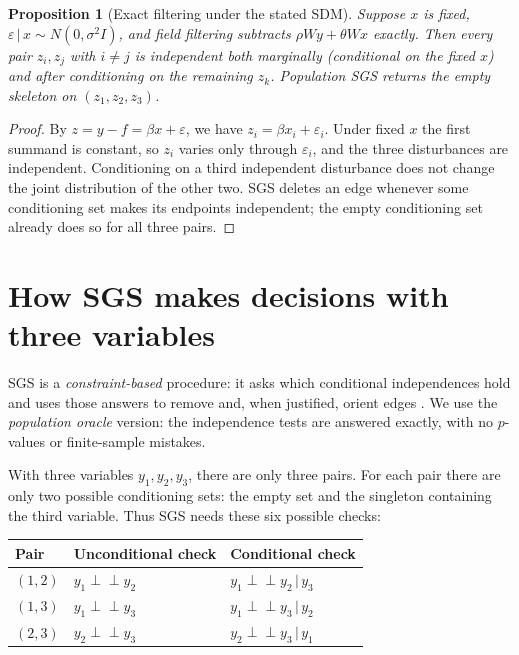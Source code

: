 \documentclass[11pt,a4paper]{article}
\newcommand{\indep}{\mathrel{\perp\!\!\!\perp}}
\newcommand{\given}{\,\vert\,}
\newtheorem{proposition}{Proposition}
\begin{document}
\begin{proposition}[Exact filtering under the stated SDM]
Suppose $x$ is fixed, $\varepsilon\given x\sim N(0,\sigma^2I)$, and field filtering subtracts $\rho Wy+\theta Wx$ exactly. Then every pair $z_i,z_j$ with $i\ne j$ is independent both marginally (conditional on the fixed $x$) and after conditioning on the remaining $z_k$. Population SGS returns the empty skeleton on $(z_1,z_2,z_3)$.
\end{proposition}
\begin{proof}
By $z=y-f=\beta x+\varepsilon$, we have $z_i=\beta x_i+\varepsilon_i$. Under fixed $x$ the first summand is constant, so $z_i$ varies only through $\varepsilon_i$, and the three disturbances are independent. Conditioning on a third independent disturbance does not change the joint distribution of the other two. SGS deletes an edge whenever some conditioning set makes its endpoints independent; the empty conditioning set already does so for all three pairs.
\end{proof}

\section{How SGS makes decisions with three variables}\label{sec:sgs}

SGS is a \emph{constraint-based} procedure: it asks which conditional independences hold and uses those answers to remove and, when justified, orient edges \cite{spirtes,colombo}. We use the \emph{population oracle} version: the independence tests are answered exactly, with no $p$-values or finite-sample mistakes.

With three variables $y_1,y_2,y_3$, there are only three pairs. For each pair there are only two possible conditioning sets: the empty set and the singleton containing the third variable. Thus SGS needs these six possible checks:
\begin{center}
\begin{tabular}{@{}lll@{}}
\toprule
Pair&Unconditional check&Conditional check\\\midrule
$(1,2)$&$y_1\indep y_2$&$y_1\indep y_2\given y_3$\\
$(1,3)$&$y_1\indep y_3$&$y_1\indep y_3\given y_2$\\
$(2,3)$&$y_2\indep y_3$&$y_2\indep y_3\given y_1$\\
\bottomrule
\end{tabular}
\end{center}
\end{document}
